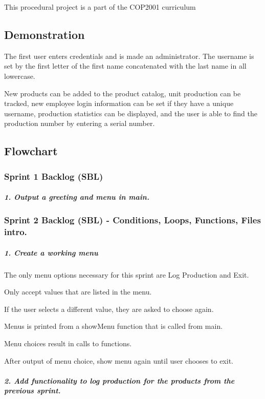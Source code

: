 This procedural project is a part of the C\+O\+P2001 curriculum

\subsection*{Demonstration}

The first user enters credentials and is made an administrator. The username is set by the first letter of the first name concatenated with the last name in all lowercase. 

New products can be added to the product catalog, unit production can be tracked, new employee login information can be set if they have a unique username, production statistics can be displayed, and the user is able to find the production number by entering a serial number. 

\subsection*{Flowchart}



\subsubsection*{Sprint 1 Backlog (S\+BL)}

\subparagraph*{1. Output a greeting and menu in main.}

\subsubsection*{Sprint 2 Backlog (S\+BL) -\/ Conditions, Loops, Functions, Files intro.}

\subparagraph*{1. Create a working menu}


\begin{DoxyItemize}
\item The only menu options necessary for this sprint are Log Production and Exit.
\item Only accept values that are listed in the menu.
\item If the user selects a different value, they are asked to choose again.
\item Menus is printed from a show\+Menu function that is called from main.
\item Menu choices result in calls to functions.
\item After output of menu choice, show menu again until user chooses to exit. \subparagraph*{2. Add functionality to log production for the products from the previous sprint.}
\end{DoxyItemize}


